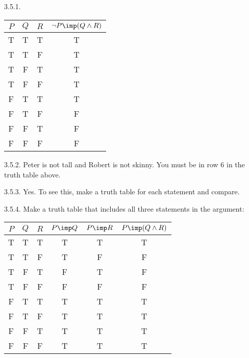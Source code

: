  \protect {} \protect \begin {itemize} 
\begin{ans}{3.5.1.}
    \begin{tabular}{c|c|c||c}
                     $P$&$Q$&$R$& $\neg P \imp (Q \wedge R)$ \\ \hline
                     T & T & T & T\\
                     T & T & F & T\\
                     T & F & T & T\\
                     T & F & F & T \\
                     F & T & T & T\\
                     F & T & F & F\\
                     F & F & T & F\\
                     F & F & F & F
                    \end{tabular}
  
\end{ans}
\begin{ans}{3.5.2.}
    Peter is not tall and Robert is not skinny.  You must be in row 6 in the truth table above.
  
\end{ans}
\begin{ans}{3.5.3.}
    Yes.  To see this, make a truth table for each statement and compare.
  
\end{ans}
\begin{ans}{3.5.4.}
    Make a truth table that includes all three statements in the argument:

    \begin{tabular}{c|c|c||c|c|c}
     $P$ & $Q$ & $R$ & $P \imp Q$ & $P \imp R$ & $P \imp (Q \wedge R)$ \\ \hline
      T  &  T  &  T  &      T     &      T     &   T \\
      T  &  T  &  F  &      T     &      F     &   F \\
      T  &  F  &  T  &      F     &      T     &   F \\
      T  &  F  &  F  &      F     &      F     &   F \\
      F  &  T  &  T  &      T     &      T     &   T \\
      F  &  T  &  F  &      T     &      T     &   T \\
      F  &  F  &  T  &      T     &      T     &   T \\
      F  &  F  &  F  &      T     &      T     &   T
    \end{tabular}


\end{ans}
\end{itemize}
